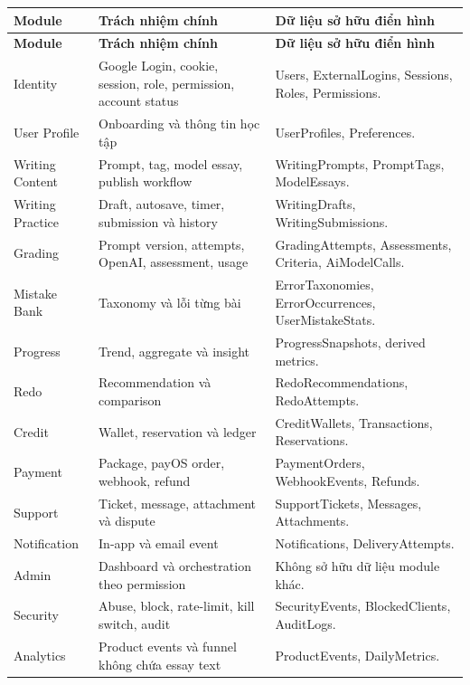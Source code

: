 \documentclass[11pt,a4paper]{article}
\begin{document}
\begin{longtable}{|P{0.21\textwidth}|P{0.37\textwidth}|P{0.31\textwidth}|}
\hline
\textbf{Module} & \textbf{Trách nhiệm chính} & \textbf{Dữ liệu sở hữu điển hình} \\ \hline
\endfirsthead
\hline
\textbf{Module} & \textbf{Trách nhiệm chính} & \textbf{Dữ liệu sở hữu điển hình} \\ \hline
\endhead
Identity & Google Login, cookie, session, role, permission, account status & Users, ExternalLogins, Sessions, Roles, Permissions. \\ \hline
User Profile & Onboarding và thông tin học tập & UserProfiles, Preferences. \\ \hline
Writing Content & Prompt, tag, model essay, publish workflow & WritingPrompts, PromptTags, ModelEssays. \\ \hline
Writing Practice & Draft, autosave, timer, submission và history & WritingDrafts, WritingSubmissions. \\ \hline
Grading & Prompt version, attempts, OpenAI, assessment, usage & GradingAttempts, Assessments, Criteria, AiModelCalls. \\ \hline
Mistake Bank & Taxonomy và lỗi từng bài & ErrorTaxonomies, ErrorOccurrences, UserMistakeStats. \\ \hline
Progress & Trend, aggregate và insight & ProgressSnapshots, derived metrics. \\ \hline
Redo & Recommendation và comparison & RedoRecommendations, RedoAttempts. \\ \hline
Credit & Wallet, reservation và ledger & CreditWallets, Transactions, Reservations. \\ \hline
Payment & Package, payOS order, webhook, refund & PaymentOrders, WebhookEvents, Refunds. \\ \hline
Support & Ticket, message, attachment và dispute & SupportTickets, Messages, Attachments. \\ \hline
Notification & In-app và email event & Notifications, DeliveryAttempts. \\ \hline
Admin & Dashboard và orchestration theo permission & Không sở hữu dữ liệu module khác. \\ \hline
Security & Abuse, block, rate-limit, kill switch, audit & SecurityEvents, BlockedClients, AuditLogs. \\ \hline
Analytics & Product events và funnel không chứa essay text & ProductEvents, DailyMetrics. \\ \hline
\end{longtable}
\end{document}
